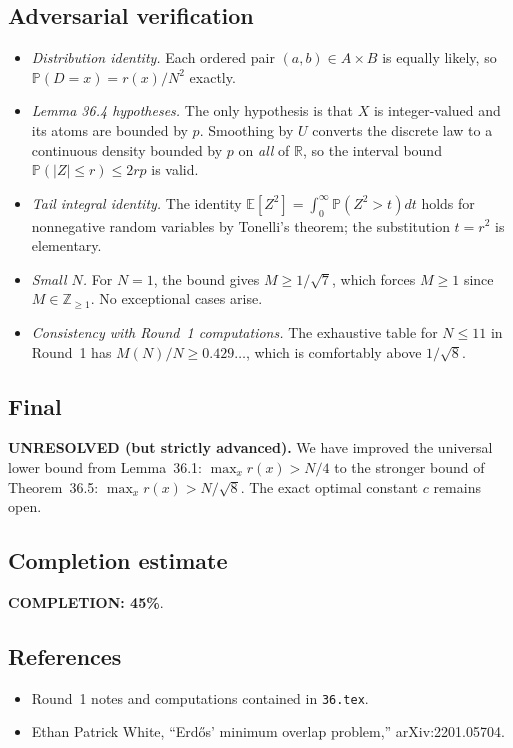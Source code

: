 \subsection{Adversarial verification}
\begin{itemize}
\item \emph{Distribution identity.} Each ordered pair \((a,b)\in A\times B\) is equally likely, so
\(\mathbb P(D=x)=r(x)/N^2\) exactly.
\item \emph{Lemma 36.4 hypotheses.} The only hypothesis is that \(X\) is integer-valued and its atoms are bounded by \(p\). Smoothing by \(U\) converts the discrete law to a continuous density bounded by \(p\) on \emph{all} of \(\mathbb R\), so the interval bound \(\mathbb P(|Z|\le r)\le 2rp\) is valid.
\item \emph{Tail integral identity.} The identity
\(\mathbb E[Z^2]=\int_0^{\infty} \mathbb P(Z^2>t)dt\)
holds for nonnegative random variables by Tonelli's theorem; the substitution \(t=r^2\) is elementary.
\item \emph{Small \(N\).} For \(N=1\), the bound gives \(M\ge 1/\sqrt 7\), which forces \(M\ge 1\) since \(M\in\mathbb Z_{\ge 1}\). No exceptional cases arise.
\item \emph{Consistency with Round~1 computations.} The exhaustive table for \(N\le 11\) in Round~1 has
\(M(N)/N\ge 0.429\ldots\), which is comfortably above \(1/\sqrt 8\).
\end{itemize}

\subsection{Final}
\textbf{UNRESOLVED (but strictly advanced).}
We have improved the universal lower bound from Lemma~36.1:
\(\max_x r(x) > N/4\)
to the stronger bound of Theorem~36.5:
\(\max_x r(x) > N/\sqrt 8\).
The exact optimal constant \(c\) remains open.

\subsection{Completion estimate}
\textbf{COMPLETION: 45\%}.

\subsection{References}
\begin{itemize}
\item Round~1 notes and computations contained in \texttt{36.tex}.
\item Ethan Patrick White, ``Erd\H{o}s' minimum overlap problem,'' arXiv:2201.05704.
\end{itemize}

